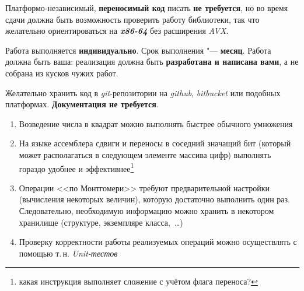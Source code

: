 \documentclass{ca-capstone}
\begin{document}
Платформо-независимый, \textbf{переносимый код} писать \textbf{не требуется}, но во время
сдачи должна быть возможность проверить работу библиотеки, так что желательно
ориентироваться на \textbf{\emph{x86-64}} без расширения \emph{AVX}.

\schedule
Работа выполняется \textbf{индивидуально}. Срок выполнения "--- \textbf{месяц}. Работа должна
быть ваша: реализация должна быть \textbf{разработана и написана вами}, а не собрана из кусков
чужих работ.

Желательно хранить код в \emph{git}-репозитории на \emph{github}, \emph{bitbucket} или подобных
платформах. \textbf{Документация не требуется}.

\remarks
\begin{enumerate}
  \item Возведение числа в квадрат можно выполнять быстрее обычного умножения
  \item На языке ассемблера сдвиги и переносы в соседний значащий бит (который может
    располагаться в следующем элементе массива цифр) выполнять гораздо удобнее и
    эффективнее\footnote{какая инструкция выполняет сложение с учётом флага переноса?}
  \item Операции <<по Монтгомери>> требуют предварительной настройки (вычисления некоторых
    величин), которую достаточно выполнить один раз. Следовательно, необходимую информацию
    можно хранить в некотором хранилище (структуре, экземпляре класса,~\ldots)
  \item Проверку корректности работы реализуемых операций можно осуществлять с помощью т.\,н.
    \emph{Unit-тестов}
\end{enumerate}

\end{document}
